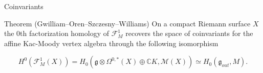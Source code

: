 \documentclass{beamer}
\newcommand{\C}{\mathbb{C}}
\begin{document}
\begin{frame}{Coinvariants}

    
    \begin{block}{Theorem (Gwilliam--Oren--Szczesny--Williams)}
        On a compact Riemann surface $X$ the $0$th factorization homology of $\mathcal{F}^1_M$ recovers the space of coinvariants for the affine Kac-Moody vertex algebra through the following isomorphism

        \[
         H^0(\mathcal{F}^1_M(X))=H_0 ( \mathfrak{g} \otimes \Omega^{0,*}(X) \oplus \C K, \mathcal{M}(X) ) \simeq H_0(\mathfrak{g}_{out}, M).
          \]
    \end{block}


\end{frame}



\end{document}
